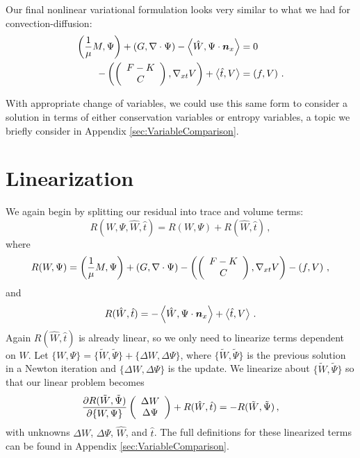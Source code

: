 \documentclass[Dissertation.tex]{subfiles}
\begin{document}
Our final nonlinear variational formulation looks very similar to what we had for convection-diffusion:
\begin{align*}
\left( \frac{1}{\mu}M,\Psi \right)+\left( G,\nabla\cdot\Psi \right)-\left\langle \hat W,\Psi\cdot\boldsymbol n_x \right\rangle&=0\\
-\left( \left( \begin{array}{c} F-K\\ C\\ \end{array} \right),\nabla_{xt} V \right)+\left\langle \hat t,V \right\rangle&=\left( f,V \right)\,.
\end{align*}

With appropriate change of variables, we could use this same form to consider a solution in terms
of either conservation variables or entropy variables, 
a topic we briefly consider in Appendix \ref{sec:VariableComparison}.


\section{Linearization}
We again begin by splitting our residual into trace and volume terms:
\[
R(W,\Psi,\hat W,\hat t) = R(W,\Psi) + R(\hat W,\hat t)\,,
\]
where
\[
R(W,\Psi)=
\left( \frac{1}{\mu}M,\Psi \right)+\left( G,\nabla\cdot\Psi \right)
-\left( \left( \begin{array}{c} F-K\\ C\\ \end{array} \right),\nabla_{xt} V \right)-\left( f,V \right)\,,
\]
and
\[
R(\hat W,\hat t)=
-\left\langle \hat W,\Psi\cdot\boldsymbol n_x \right\rangle
+\left\langle \hat t,V \right\rangle\,.
\]
Again $R(\hat W,\hat t)$ is already linear, so we only need to linearize terms dependent on $W$.
Let $\{W,\Psi\}=\{\tilde W,\tilde\Psi\}+\{\Delta W,\Delta\Psi\}$, where $\{\tilde W,\tilde\Psi\}$ 
is the previous solution in a Newton iteration and 
$\{\Delta W,\Delta\Psi\}$ is the update. We linearize about $\{\tilde W,\tilde\Psi\}$ so that our linear problem becomes
\[
\frac{\partial R(\tilde W,\tilde\Psi)}{\partial\{W,\Psi\}}\left( \begin{array}{c} \Delta W\\ \Delta\Psi\\ \end{array} \right)+R(\hat W,\hat t)=-R(\tilde W,\tilde\Psi)\,,
\]
with unknowns $\Delta W$, $\Delta\Psi$, $\hat W$, and $\hat t$.
The full definitions for these linearized terms can be found in Appendix \ref{sec:VariableComparison}.
\end{document}
